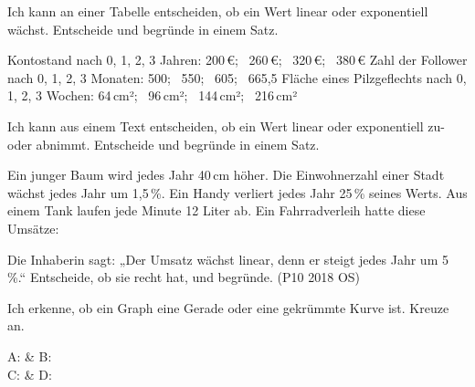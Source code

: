\begin{aufgabe}{Ich kann an einer Tabelle entscheiden, ob ein Wert linear oder exponentiell wächst.}
Entscheide und begründe in einem Satz.
\begin{teile}
\teil Kontostand nach 0, 1, 2, 3 Jahren: 200\,€; \ 260\,€; \ 320\,€; \ 380\,€
\teil Zahl der Follower nach 0, 1, 2, 3 Monaten: 500; \ 550; \ 605; \ 665,5
\teil Fläche eines Pilzgeflechts nach 0, 1, 2, 3 Wochen: 64\,cm²; \ 96\,cm²; \ 144\,cm²; \ 216\,cm²
\end{teile}
\end{aufgabe}

\begin{aufgabe}{Ich kann aus einem Text entscheiden, ob ein Wert linear oder exponentiell zu- oder abnimmt.}
Entscheide und begründe in einem Satz.
\begin{teile}
\teil Ein junger Baum wird jedes Jahr 40\,cm höher.
\teil Die Einwohnerzahl einer Stadt wächst jedes Jahr um 1,5\,\%.
\teil Ein Handy verliert jedes Jahr 25\,\% seines Werts.
\teil Aus einem Tank laufen jede Minute 12 Liter ab.
\teil Ein Fahrradverleih hatte diese Umsätze:


Die Inhaberin sagt: „Der Umsatz wächst linear, denn er steigt jedes Jahr um 5\,\%.“ Entscheide, ob sie recht hat, und begründe. (P10 2018 OS)
\end{teile}
\end{aufgabe}


\begin{aufgabe}{Ich erkenne, ob ein Graph eine Gerade oder eine gekrümmte Kurve ist.}
Kreuze an.

\begin{ksys}[xmin=0,xmax=5,ymin=0,ymax=8,ystep=2,ablesen]
\end{ksys}\ksysabstand\begin{ksys}[xmin=0,xmax=5,ymin=0,ymax=8,ystep=2,ablesen]
\end{ksys}

\begin{ksys}[xmin=0,xmax=5,ymin=0,ymax=8,ystep=2,ablesen]
\end{ksys}\ksysabstand\begin{ksys}[xmin=0,xmax=5,ymin=0,ymax=8,ystep=2,ablesen]
\end{ksys}

\begin{teilezwei}
\tz A:  & \tz B:  \\
\tz C:  & \tz D:  \\
\end{teilezwei}
\end{aufgabe}

